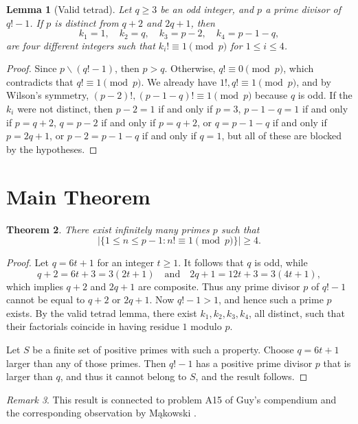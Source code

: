 \documentclass[12pt]{amsart}
\newtheorem{thm}{Theorem}[section]
\newtheorem{lem}[thm]{Lemma}
\theoremstyle{remark}
\newtheorem{remark}[thm]{Remark}
\begin{document}
\begin{lem}[Valid tetrad]
Let $q\geq 3$ be an odd integer, and $p$ a prime divisor of $q!-1$. If $p$ is distinct from
$q+2$ and $2q+1$, then
\[
k_{1}=1,\quad k_{2}=q, \quad k_{3}=p-2,\quad k_{4}=p-1-q,
\]
are four different integers such that $k_{i}!\equiv 1 \pmod{p}$ for $1\leq i \leq 4$.
\end{lem}

\begin{proof}
Since $p\backslash(q!-1)$, then $p>q$. Otherwise, $q!\equiv 0 \pmod{p}$, which contradicts
that $q!\equiv 1 \pmod{p}$. We already have $1!,q!\equiv 1\pmod{p}$, and by Wilson's symmetry,
$(p-2)!,(p-1-q)!\equiv 1 \pmod{p}$ because $q$ is odd. If the $k_{i}$ were not distinct, then $p-2=1$ if and only if $p=3$, $p-1-q=1$ if and only if $p=q+2$,
$q=p-2$ if and only if $p=q+2$, or $q=p-1-q$ if and only if $p=2q+1$, or $p-2=p-1-q$ if
and only if $q=1$, but all of these are blocked by the hypotheses.
\end{proof}

\section{Main Theorem}

\begin{thm} There exist infinitely many primes $p$ such that
\[
|\{1\leq n\leq p-1:n!\equiv 1 \pmod{p}\}| \geq 4.
\]
\end{thm}
\begin{proof}
Let $q=6t+1$ for an integer $t\geq 1$. It follows that $q$ is odd, while
\[
q+2 = 6t+3 = 3(2t+1)\quad\text{and}\quad 2q+1 = 12t+3 = 3(4t+1),
\]
which implies $q+2$ and $2q+1$ are composite. Thus any prime divisor $p$ of $q!-1$ cannot
be equal to $q+2$ or $2q+1$. Now $q!-1>1$, and hence such a prime $p$ exists. By the valid tetrad
lemma, there exist $k_{1},k_{2},k_{3},k_{4}$, all distinct, such that their factorials
coincide in having residue $1$ modulo $p$.

Let $S$ be a finite set of positive primes with such a property. Choose $q=6t+1$ larger
than any of those primes. Then $q!-1$ has a positive prime divisor $p$ that is larger than $q$, and thus
it cannot belong to $S$, and the result follows.
\end{proof}

\begin{remark}
This result is connected to problem A15 of Guy's compendium \cite[p. 54]{rK04} and the corresponding observation by Mąkowski \cite{Makowski1983}.
\end{remark}
\end{document}
